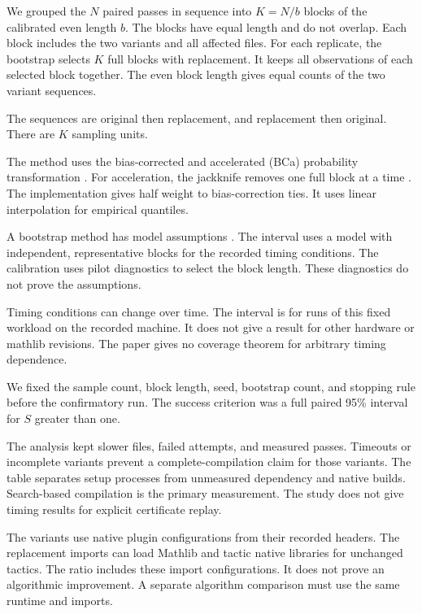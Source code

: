 We grouped the $N$ paired passes in sequence into $K=N/b$ blocks of the calibrated even length $b$.
The blocks have equal length and do not overlap.
Each block includes the two variants and all affected files.
For each replicate, the bootstrap selects $K$ full blocks with replacement.
It keeps all observations of each selected block together.
The even block length gives equal counts of the two variant sequences.

The sequences are original then replacement, and replacement then original.
There are $K$ sampling units.

The method uses the bias-corrected and accelerated (BCa) probability transformation \citep{efron1987}.
For acceleration, the jackknife removes one full block at a time \citep{diciccioefron1996}.
The implementation gives half weight to bias-correction ties.
It uses linear interpolation for empirical quantiles.

A bootstrap method has model assumptions \citep{fieldwelsh2007}.
The interval uses a model with independent, representative blocks for the recorded timing conditions.
The calibration uses pilot diagnostics to select the block length.
These diagnostics do not prove the assumptions.

Timing conditions can change over time.
The interval is for runs of this fixed workload on the recorded machine.
It does not give a result for other hardware or mathlib revisions.
The paper gives no coverage theorem for arbitrary timing dependence.

We fixed the sample count, block length, seed, bootstrap count, and stopping rule before the confirmatory run.
The success criterion was a full paired 95\% interval for $S$ greater than one.


\FloatBarrier

The analysis kept slower files, failed attempts, and measured passes.
Timeouts or incomplete variants prevent a complete-compilation claim for those variants.
The table separates setup processes from unmeasured dependency and native builds.
Search-based compilation is the primary measurement.
The study does not give timing results for explicit certificate replay.


\FloatBarrier

The variants use native plugin configurations from their recorded headers.
The replacement imports can load Mathlib and tactic native libraries for unchanged tactics.
The ratio includes these import configurations.
It does not prove an algorithmic improvement.
A separate algorithm comparison must use the same runtime and imports.

